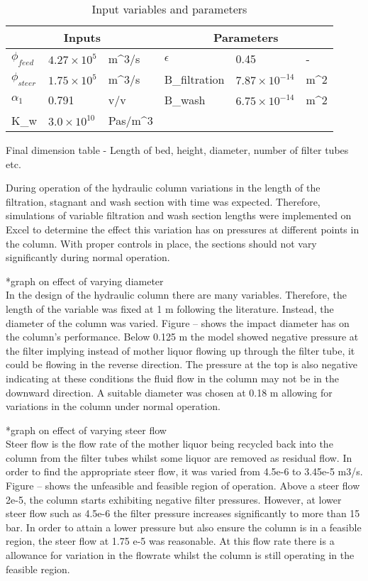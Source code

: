\begin{table}[]
\caption{Input variables and parameters}
\label{tab:inputsparameters}
\begin{tabular}{llllll}
\hline
\multicolumn{3}{|c|}{Inputs}          & \multicolumn{3}{c|}{Parameters}             \\ \toprule
$\phi_{feed}$  & $4.27\times10^{5}$ & m^{3}/s &
$\epsilon$  & 0.45  & - \\ \hline
$\phi_{steer}$    & $1.75\times10^{5}$ & m^{3}/s &
B_{filtration}  & $7.87\times10^{-14}$ & m^{2} \\ \hline
$\alpha_1$ & 0.791  & v/v &
B_{wash}  & $6.75\times10^{-14}$ & m^{2} \\ \hline
K_{w} &  $3.0\times10^{10}$ & Pas/m^{3}  & &  &  \\ \bottomrule
\end{tabular}
\end{table}


Final dimension table - Length of bed, height, diameter, number of filter tubes etc. 

During operation of the hydraulic column  variations in the length of the filtration, stagnant and wash section with time was expected. Therefore, simulations of variable filtration and wash section lengths were implemented on Excel to determine the effect this variation has on pressures at different points in the column. With proper controls in place, the sections should not vary significantly during normal operation. 

*graph on effect of varying diameter 
\\In the design of the hydraulic column there are many variables. Therefore, the length of the variable was fixed at 1 m following the literature. Instead, the diameter of the column was varied. Figure -- shows the impact diameter has on the column's performance. Below 0.125 m the model showed negative pressure at the filter implying instead of mother liquor flowing up through the filter tube, it could be flowing in the reverse direction. The pressure at the top is also negative indicating at these conditions the fluid flow in the column may not be in the downward direction. A suitable diameter was chosen at 0.18 m allowing for variations in the column under normal operation. 

*graph on effect of varying steer flow 
\\Steer flow is the flow rate of the mother liquor being recycled back into the column from the filter tubes whilst some liquor are removed as residual flow. In order to find the appropriate steer flow, it was varied from 4.5e-6 to 3.45e-5 m3/s. Figure -- shows the unfeasible and feasible region of operation. Above a steer flow 2e-5, the column starts exhibiting negative filter pressures. However, at lower steer flow such as 4.5e-6 the filter pressure increases significantly to more than 15 bar. In order to attain a lower pressure but also ensure the column is in a feasible region, the steer flow at 1.75 e-5 was reasonable. At this flow rate there is a allowance for variation in the flowrate whilst the column is still operating in the feasible region. 


